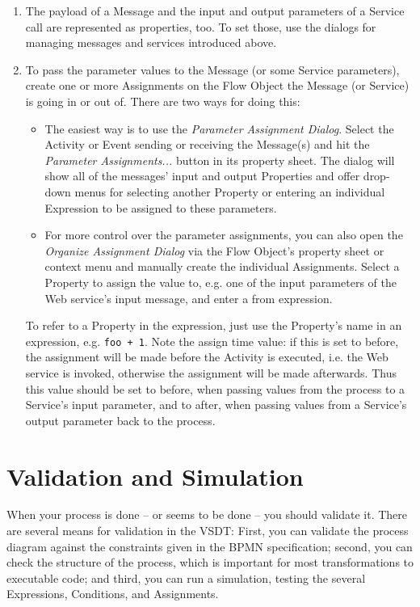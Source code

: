\begin{enumerate}
	\item The payload of a Message and the input and output parameters of a
	Service call are represented as properties, too.  To set those, use the
	dialogs for managing messages and services introduced above.
	
	\item To pass the parameter values to the Message (or some Service parameters),
	create one or more Assignments on the Flow Object the Message (or Service) is
	going in or out of.  There are two ways for doing this:
	\begin{itemize}
		\item The easiest way is to use the \emph{Parameter Assignment Dialog}.
		Select the Activity or Event sending or receiving the Message(s) and hit
		the \emph{Parameter Assignments...} button in its property sheet.  The
		dialog will show all of the messages' input and output Properties and
		offer drop-down menus for selecting another Property or entering an
		individual Expression to be assigned to these parameters.
		
		\item For more control over the parameter assignments, you can also open
		the \emph{Organize Assignment Dialog} via the Flow Object's property sheet
		or context menu and manually create the individual Assignments.  Select
		a Property to assign the value to, e.g. one of the input parameters of
		the Web service's input message, and enter a from expression.
	\end{itemize}
	 To refer to a Property in the expression, just use the Property's name in an
	 expression, e.g. \verb_foo + 1_.  Note the assign time value: if this is set
	 to {\sc before}, the assignment will be made before the Activity is executed,
	 i.e. the Web service is invoked, otherwise the assignment will be made
	 afterwards.  Thus this value should be set to {\sc before}, when passing
	 values from the process to a Service's input parameter, and to {\sc after},
	 when passing values from a Service's output parameter back to the process.
\end{enumerate}



\section{Validation and Simulation}

When your process is done -- or seems to be done -- you should validate it.  There
are several means for validation in the VSDT: First, you can validate the process
diagram against the constraints given in the BPMN specification; second, you can
check the structure of the process, which is important for most transformations
to executable code; and third, you can run a simulation, testing the several
Expressions, Conditions, and Assignments.

